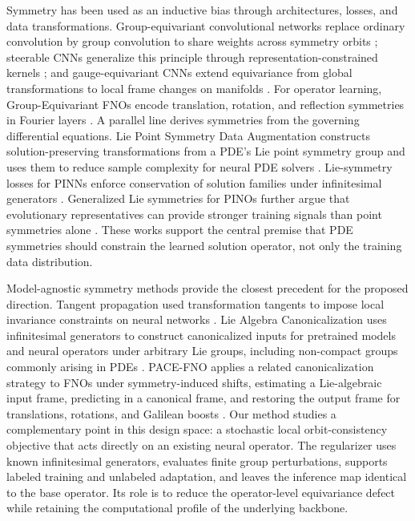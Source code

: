 Symmetry has been used as an inductive bias through architectures, losses, and data transformations. Group-equivariant convolutional networks replace ordinary convolution by group convolution to share weights across symmetry orbits \citep{cohen2016gcnn}; steerable CNNs generalize this principle through representation-constrained kernels \citep{weiler2019e2cnn}; and gauge-equivariant CNNs extend equivariance from global transformations to local frame changes on manifolds \citep{cohen2019gauge}. For operator learning, Group-Equivariant FNOs encode translation, rotation, and reflection symmetries in Fourier layers \citep{helwig2023gfno}. A parallel line derives symmetries from the governing differential equations. Lie Point Symmetry Data Augmentation constructs solution-preserving transformations from a PDE's Lie point symmetry group and uses them to reduce sample complexity for neural PDE solvers \citep{brandstetter2022lpsda}. Lie-symmetry losses for PINNs enforce conservation of solution families under infinitesimal generators \citep{akhoundsadegh2023liepinn}. Generalized Lie symmetries for PINOs further argue that evolutionary representatives can provide stronger training signals than point symmetries alone \citep{wang2025generalizedliepino}. These works support the central premise that PDE symmetries should constrain the learned solution operator, not only the training data distribution.

Model-agnostic symmetry methods provide the closest precedent for the proposed direction. Tangent propagation used transformation tangents to impose local invariance constraints on neural networks \citep{simard1991tangentprop}. Lie Algebra Canonicalization uses infinitesimal generators to construct canonicalized inputs for pretrained models and neural operators under arbitrary Lie groups, including non-compact groups commonly arising in PDEs \citep{shumaylov2025lielac}. PACE-FNO applies a related canonicalization strategy to FNOs under symmetry-induced shifts, estimating a Lie-algebraic input frame, predicting in a canonical frame, and restoring the output frame for translations, rotations, and Galilean boosts \citep{xu2026pacefno}. Our method studies a complementary point in this design space: a stochastic local orbit-consistency objective that acts directly on an existing neural operator. The regularizer uses known infinitesimal generators, evaluates finite group perturbations, supports labeled training and unlabeled adaptation, and leaves the inference map identical to the base operator. Its role is to reduce the operator-level equivariance defect while retaining the computational profile of the underlying backbone.

